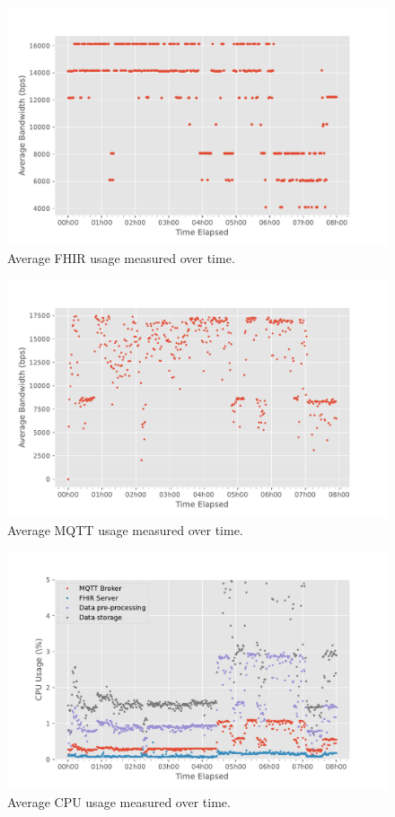 \begin{figure}[H]
    \centering
    \includegraphics[width=0.66\linewidth]{images/PILOTfhir_bandwidth.pdf}
    \caption{Average \acs{FHIR} usage measured over time.}
    \label{fig:pilot-fhir-bandwidth}
\end{figure}

\begin{figure}[H]
    \centering
    \includegraphics[width=0.66\linewidth]{images/PILOTmqtt_bandwidth.pdf}
    \caption{Average \acs{MQTT} usage measured over time.}
    \label{fig:pilot-mqtt-bandwidth}
\end{figure}

\begin{figure}[H]
    \centering
    \includegraphics[width=0.66\linewidth]{images/PILOTcpu_usage.pdf}
    \caption{Average CPU usage measured over time.}
    \label{fig:pilot-cou-usage}
\end{figure}

